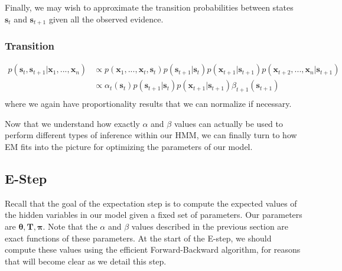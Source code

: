 Finally, we may wish to approximate the transition probabilities between states $\textbf{s}_t$ and $\textbf{s}_{t+1}$ given all the observed evidence.

\subsubsection{Transition}
\begin{align} \label{transition-fn}
	p(\textbf{s}_{t}, \textbf{s}_{t+1} | \textbf{x}_1, ..., \textbf{x}_n) &\propto p(\textbf{x}_1, ..., \textbf{x}_t, \textbf{s}_t) p(\textbf{s}_{t+1} | \textbf{s}_{t}) p(\textbf{x}_{t+1} | \textbf{s}_{t+1}) p(\textbf{x}_{t+2}, ..., \textbf{x}_{n} | \textbf{s}_{t+1}) \\
	&\propto \alpha_t(\textbf{s}_t) p(\textbf{s}_{t+1} | \textbf{s}_{t}) p(\textbf{x}_{t+1} | \textbf{s}_{t+1}) \beta_{t+1}(\textbf{s}_{t+1}) \\
\end{align}
where we again have proportionality results that we can normalize if necessary.

Now that we understand how exactly $\alpha$ and $\beta$ values can actually be used to perform different types of inference within our HMM, we can finally turn to how EM fits into the picture for optimizing the parameters of our model.

\subsection{E-Step}
Recall that the goal of the expectation step is to compute the expected values of the hidden variables in our model given a fixed set of parameters. Our parameters are $\boldsymbol{\theta}, \textbf{T}, \boldsymbol{\pi}$. Note that the $\alpha$ and $\beta$ values described in the previous section are exact functions of these parameters. At the start of the E-step, we should compute these values using the efficient Forward-Backward algorithm, for reasons that will become clear as we detail this step.

